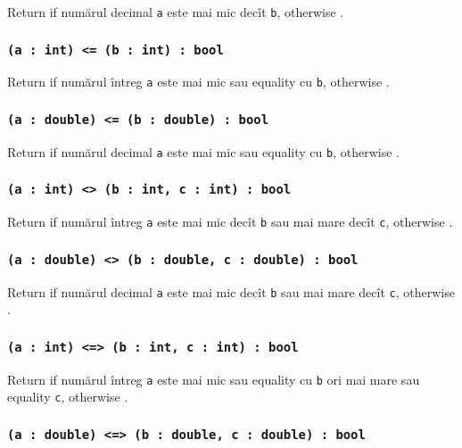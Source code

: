 Return \true{} if numărul decimal \texttt{a} este mai mic decît \texttt{b}, otherwise \false{}.

\subsubsection{\texttt{(a : int) <= (b : int) : bool}}

Return \true{} if numărul întreg \texttt{a} este mai mic sau equality cu \texttt{b}, otherwise \false{}.

\subsubsection{\texttt{(a : double) <= (b : double) : bool}}

Return \true{} if numărul decimal \texttt{a} este mai mic sau equality cu \texttt{b}, otherwise \false{}.

\subsubsection{\texttt{(a : int) <> (b : int, c : int) : bool}}

Return \true{} if numărul întreg \texttt{a} este mai mic decît \texttt{b} sau mai mare decît \texttt{c}, otherwise \false{}.

\subsubsection{\texttt{(a : double) <> (b : double, c : double) : bool}}

Return \true{} if numărul decimal \texttt{a} este mai mic decît \texttt{b} sau mai mare decît \texttt{c}, otherwise \false{}.

\subsubsection{\texttt{(a : int) <=> (b : int, c : int) : bool}}

Return \true{} if numărul întreg \texttt{a} este mai mic sau equality cu \texttt{b} ori mai mare sau equality \texttt{c}, otherwise \false{}.

\subsubsection{\texttt{(a : double) <=> (b : double, c : double) : bool}}


